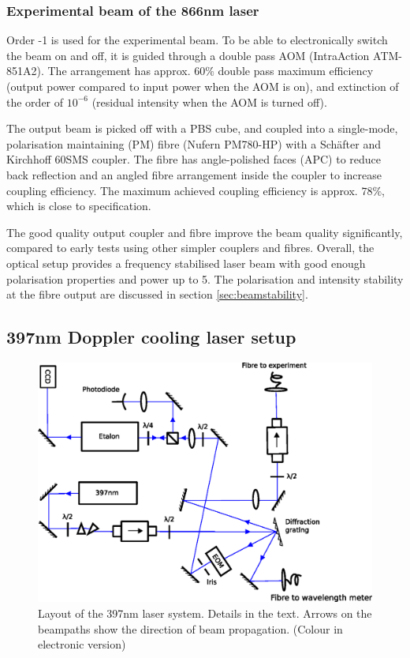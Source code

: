 \subsubsection{Experimental beam of the 866nm laser}

Order -1 is used for the experimental beam. To be able to electronically switch the beam on and off, it is guided through a double pass AOM (IntraAction ATM-851A2). The arrangement has approx. $60\%$ double pass maximum efficiency (output power compared to input power when the AOM is on), and extinction of the order of $10^{-6}$ (residual intensity when the AOM is turned off). 

The output beam is picked off with a PBS cube, and coupled into a single-mode, polarisation maintaining (PM) fibre (Nufern PM780-HP) with a Sch\"{a}fter and Kirchhoff 60SMS coupler. The fibre has angle-polished faces (APC) to reduce back reflection and an angled fibre arrangement inside the coupler to increase coupling efficiency. The maximum achieved coupling efficiency is approx. $78\%$, which is close to specification.

The good quality output coupler and fibre improve the beam quality significantly, compared to early tests using other simpler couplers and fibres. Overall, the optical setup provides a frequency stabilised laser beam with good enough polarisation properties and power up to 5\mW. The polarisation and intensity stability at the fibre output are discussed in section \ref{sec:beamstability}.



\subsection{397nm Doppler cooling laser setup}
\label{subsec:397setup}


\begin{figure}[h!t]
\centering
\includegraphics[width=13cm]{chapter4/397layout/397layout_v2}
\caption[397nm laser layout]{Layout of the 397nm laser system. Details in the text. Arrows on the beampaths show the direction of beam propagation. (Colour in electronic version)}
\label{fig:397layout}
\end{figure} 

